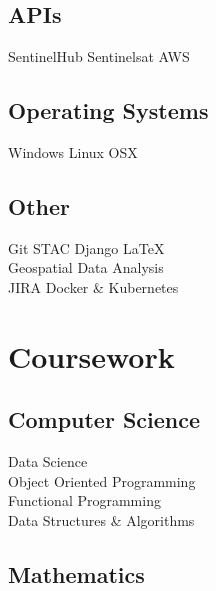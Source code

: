 \documentclass[letterpaper]{deedy-resume} %
\begin{document}
\begin{minipage}[t]{0.33\textwidth}
    \subsection{APIs}

        \textbullet{} SentinelHub \textbullet{} Sentinelsat \textbullet{} AWS
        \sectionspace

    \subsection{Operating Systems}
        \textbullet{} Windows \textbullet{} Linux \textbullet{} OSX
        \sectionspace

    \subsection{Other}
        \textbullet{} Git \textbullet{} STAC \textbullet{} Django \textbullet{} \LaTeX \\ \textbullet{} Geospatial Data Analysis \\ 
        \textbullet{} JIRA \textbullet{} Docker \& Kubernetes

    \sectionspace %


\section{Coursework}


    \subsection{Computer Science}

        \textbullet{} Data Science \\
        \textbullet{} Object Oriented Programming \\
        \textbullet{} Functional Programming \\
        \textbullet{} Data Structures \& Algorithms \\
        

        \sectionspace %

    \subsection{Mathematics}


\end{minipage}
\end{document}

